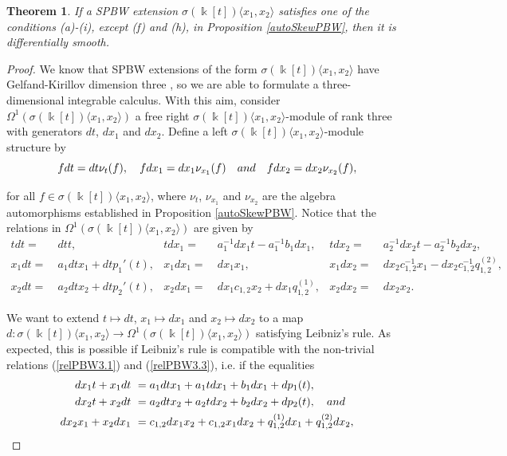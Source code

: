 \documentclass{amsart}
\newtheorem{theorem}{Theorem}[section]
\theoremstyle{definition}
\theoremstyle{remark}
\numberwithin{equation}{section}
\begin{document}
\begin{theorem}\label{smoothPBW2}
If a SPBW extension $\sigma(\Bbbk[t])\langle x_1,x_2\rangle$ satisfies one of the conditions {\rm (a)}-{\rm (i)}, except {\rm (f)} and {\rm (h)}, in Proposition  \ref{autoSkewPBW}, then it is differentially smooth.
\end{theorem}
\begin{proof}
We know that SPBW extensions of the form $\sigma(\Bbbk[t])\langle x_1,x_2\rangle$ have Gelfand-Kirillov dimension three \cite[Theorems 14 and 18]{Reyes2013}, so we are able to formulate a three-dimensional integrable calculus. With this aim, consider $\Omega^{1}(\sigma(\Bbbk[t])\langle x_1,x_2\rangle)$ a free right $\sigma(\Bbbk[t])\langle x_1,x_2\rangle$-module of rank three with generators $dt$, $dx_1$ and $dx_2$. Define a left $\sigma(\Bbbk[t])\langle x_1,x_2\rangle$-module structure by
\begin{equation}\label{relrightmod}
    f dt = dt \nu_t(f), \quad f dx_1 = dx_1\nu_{x_1}(f) \quad {\rm and} \quad  fdx_2 = dx_2\nu_{x_2}(f), 
\end{equation}

for all $f\in \sigma(\Bbbk[t])\langle x_1,x_2\rangle$, where $\nu_t$, $\nu_{x_1}$ and $\nu_{x_2}$ are the algebra automorphisms established in Proposition \ref{autoSkewPBW}. Notice that the relations in $\Omega^{1}(\sigma(\Bbbk[t])\langle x_1,x_2\rangle)$ are given by
{\footnotesize{
    \begin{align}
        tdt  = &\ dt t, & tdx_1 = &\ a_1^{-1}dx_1t - a_1^{-1}b_1dx_1, & tdx_2 = &\ a_2^{-1}dx_2t - a_2^{-1}b_2dx_2, \label{rel1} \\
        x_1dt = &\ a_1dtx_1+dtp_1'(t), & x_1dx_1 = &\ dx_1x_1, & x_1dx_2 = &\ dx_2c_{1,2}^{-1}x_1-dx_2c_{1,2}^{-1}q_{1,2}^{(2)}, \label{rel2} \\
        x_2dt = &\ a_2dtx_2+dtp_2'(t), & x_2dx_1 = &\ dx_1c_{1,2}x_2+dx_1q_{1,2}^{(1)}, &  x_2dx_2 = &\ dx_2x_2. \label{rel3} 
    \end{align}
}}

We want to extend $t\mapsto dt$, $x_1\mapsto dx_1$ and $x_2\mapsto dx_2$ to a map $d: \sigma(\Bbbk[t])\langle x_1,x_2\rangle \to \Omega^{1}(\sigma(\Bbbk[t])\langle x_1,x_2\rangle)$ satisfying Leibniz's rule. As expected, this is possible if Leibniz's rule is compatible with the non-trivial relations {\rm (}\ref{relPBW3.1}{\rm )} and {\rm (}\ref{relPBW3.3}{\rm )}, i.e. if the equalities
    \begin{align*}
        dx_1t+x_1dt &\ = a_1dtx_1+a_1tdx_1+b_1dx_1+dp_1(t), \\
        dx_2t+x_2dt &\ = a_2dtx_2+a_2tdx_2+b_2dx_2+dp_2(t), \quad {\rm and} \\
        dx_2x_1+x_2dx_1 &\ = c_{1,2}dx_1x_2+c_{1,2}x_1dx_2 + q_{1,2}^{(1)}dx_1+q_{1,2}^{(2)}dx_2, 
    \end{align*}


\end{proof}
\end{document}
